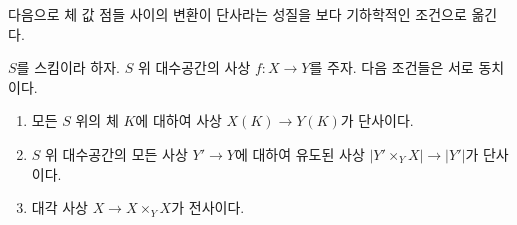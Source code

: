\noindent
다음으로 체 값 점들 사이의 변환이 단사라는 성질을 보다 기하학적인
조건으로 옮긴다.

\begin{lemma}
\label{lemma-universally-injective}
$S$를 스킴이라 하자.
$S$ 위 대수공간의 사상 $f : X \to Y$를 주자.
다음 조건들은 서로 동치이다.
\begin{enumerate}
\item 모든 $S$ 위의 체 $K$에 대하여 사상 $X(K) \to Y(K)$가 단사이다.
\item $S$ 위 대수공간의 모든 사상 $Y' \to Y$에 대하여 유도된 사상
$|Y' \times_Y X| \to |Y'|$가 단사이다.
\item 대각 사상 $X \to X \times_Y X$가 전사이다.
\end{enumerate}
\end{lemma}

